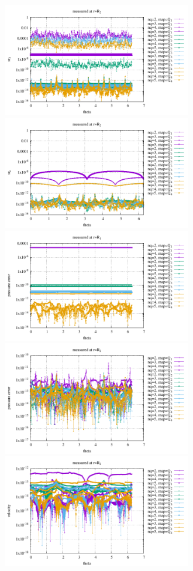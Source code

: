 \begin{center}
\includegraphics[width=8.3cm]{python_codes/fieldstone_152/results/exp1/sr3_R2}
\includegraphics[width=8.3cm]{python_codes/fieldstone_152/results/exp1/src_R2}\\
\includegraphics[width=8.3cm]{python_codes/fieldstone_152/results/exp1/qqq_R1}
\includegraphics[width=8.3cm]{python_codes/fieldstone_152/results/exp1/qqq_R2}\\
\includegraphics[width=8.3cm]{python_codes/fieldstone_152/results/exp1/vel_R2}

\end{center}
